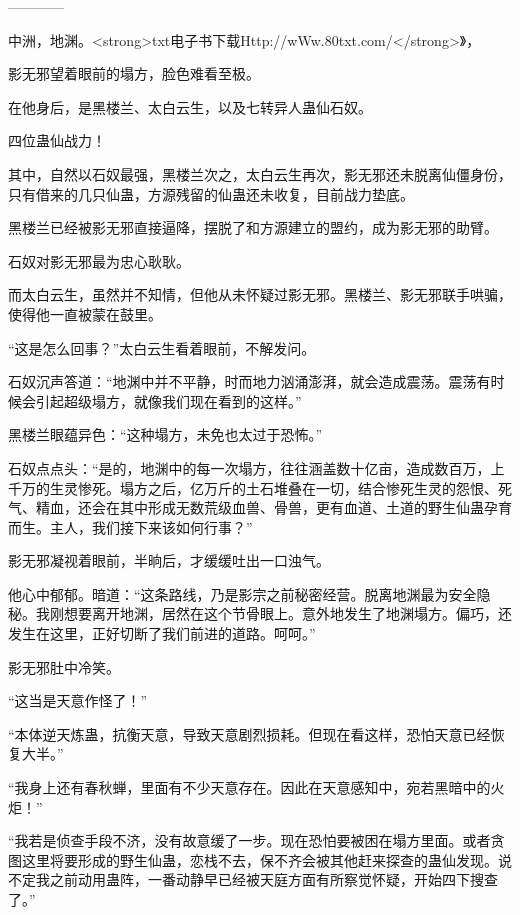 
\begin{this_body}

------------

中洲，地渊。<strong>txt电子书下载Http://wWw.80txt.com/</strong>》，

影无邪望着眼前的塌方，脸色难看至极。

在他身后，是黑楼兰、太白云生，以及七转异人蛊仙石奴。

四位蛊仙战力！

其中，自然以石奴最强，黑楼兰次之，太白云生再次，影无邪还未脱离仙僵身份，只有借来的几只仙蛊，方源残留的仙蛊还未收复，目前战力垫底。

黑楼兰已经被影无邪直接逼降，摆脱了和方源建立的盟约，成为影无邪的助臂。

石奴对影无邪最为忠心耿耿。

而太白云生，虽然并不知情，但他从未怀疑过影无邪。黑楼兰、影无邪联手哄骗，使得他一直被蒙在鼓里。

“这是怎么回事？”太白云生看着眼前，不解发问。

石奴沉声答道：“地渊中并不平静，时而地力汹涌澎湃，就会造成震荡。震荡有时候会引起超级塌方，就像我们现在看到的这样。”

黑楼兰眼蕴异色：“这种塌方，未免也太过于恐怖。”

石奴点点头：“是的，地渊中的每一次塌方，往往涵盖数十亿亩，造成数百万，上千万的生灵惨死。塌方之后，亿万斤的土石堆叠在一切，结合惨死生灵的怨恨、死气、精血，还会在其中形成无数荒级血兽、骨兽，更有血道、土道的野生仙蛊孕育而生。主人，我们接下来该如何行事？”

影无邪凝视着眼前，半晌后，才缓缓吐出一口浊气。

他心中郁郁。暗道：“这条路线，乃是影宗之前秘密经营。脱离地渊最为安全隐秘。我刚想要离开地渊，居然在这个节骨眼上。意外地发生了地渊塌方。偏巧，还发生在这里，正好切断了我们前进的道路。呵呵。”

影无邪肚中冷笑。

“这当是天意作怪了！”

“本体逆天炼蛊，抗衡天意，导致天意剧烈损耗。但现在看这样，恐怕天意已经恢复大半。”

“我身上还有春秋蝉，里面有不少天意存在。因此在天意感知中，宛若黑暗中的火炬！”

“我若是侦查手段不济，没有故意缓了一步。现在恐怕要被困在塌方里面。或者贪图这里将要形成的野生仙蛊，恋栈不去，保不齐会被其他赶来探查的蛊仙发现。说不定我之前动用蛊阵，一番动静早已经被天庭方面有所察觉怀疑，开始四下搜查了。”


\end{this_body}
